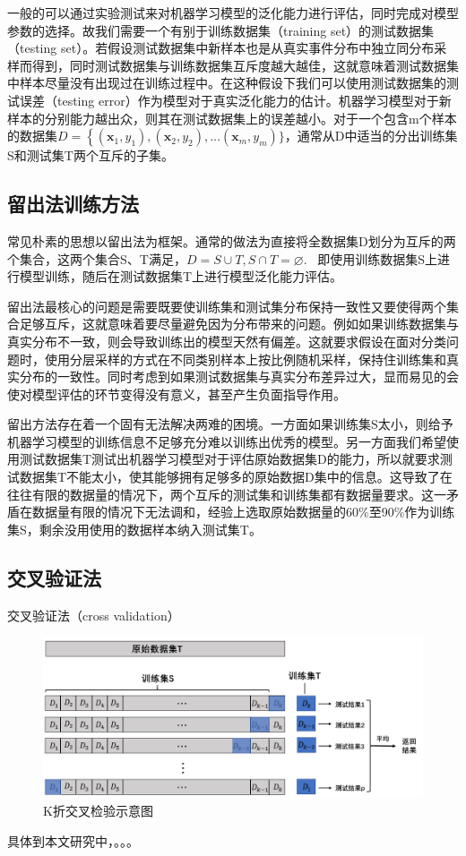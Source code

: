  \indent 一般的可以通过实验测试来对机器学习模型的泛化能力进行评估，同时完成对模型参数的选择。故我们需要一个有别于训练数据集（training set）的测试数据集（testing set）。若假设测试数据集中新样本也是从真实事件分布中独立同分布采样而得到，同时测试数据集与训练数据集互斥度越大越佳，这就意味着测试数据集中样本尽量没有出现过在训练过程中。在这种假设下我们可以使用测试数据集的测试误差（testing error）作为模型对于真实泛化能力的估计。机器学习模型对于新样本的分别能力越出众，则其在测试数据集上的误差越小。对于一个包含m个样本的数据集$D=\left\{\left(\boldsymbol{x}_{1}, y_{1}\right),\left(\boldsymbol{x}_{2}, y_{2}\right), \ldots\right.\left(\boldsymbol{x}_{m}, y_{m}\right) \}$，通常从D中适当的分出训练集S和测试集T两个互斥的子集。
 
 \subsection{留出法训练方法}
 \indent 常见朴素的思想以留出法为框架。通常的做法为直接将全数据集D划分为互斥的两个集合，这两个集合S、T满足，$D=S \cup T, S \cap T=\varnothing$. ~即使用训练数据集S上进行模型训练，随后在测试数据集T上进行模型泛化能力评估。
 
 \indent 留出法最核心的问题是需要既要使训练集和测试集分布保持一致性又要使得两个集合足够互斥，这就意味着要尽量避免因为分布带来的问题。例如如果训练数据集与真实分布不一致，则会导致训练出的模型天然有偏差。这就要求假设在面对分类问题时，使用分层采样的方式在不同类别样本上按比例随机采样，保持住训练集和真实分布的一致性。同时考虑到如果测试数据集与真实分布差异过大，显而易见的会使对模型评估的环节变得没有意义，甚至产生负面指导作用。
 
 \indent 留出方法存在着一个固有无法解决两难的困境。一方面如果训练集S太小，则给予机器学习模型的训练信息不足够充分难以训练出优秀的模型。另一方面我们希望使用测试数据集T测试出机器学习模型对于评估原始数据集D的能力，所以就要求测试数据集T不能太小，使其能够拥有足够多的原始数据D集中的信息。这导致了在往往有限的数据量的情况下，两个互斥的测试集和训练集都有数据量要求。这一矛盾在数据量有限的情况下无法调和，经验上选取原始数据量的60\%至90\%作为训练集S，剩余没用使用的数据样本纳入测试集T。
 
 \subsection{交叉验证法}
 \indent 交叉验证法（cross validation） 
  
  
  
 \begin{figure}[ht]
  \centering
  \includegraphics[width=\linewidth]{img/cv.jpg}
  \caption{K折交叉检验示意图}\label{fig:yinglimoxin}
\end{figure}

\indent 具体到本文研究中，。。。